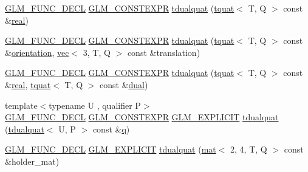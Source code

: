 \begin{DoxyCompactItemize}
\item 
\mbox{\hyperlink{setup_8hpp_ab2d052de21a70539923e9bcbf6e83a51}{G\+L\+M\+\_\+\+F\+U\+N\+C\+\_\+\+D\+E\+CL}} \mbox{\hyperlink{setup_8hpp_a08b807947b47031d3a511f03f89645ad}{G\+L\+M\+\_\+\+C\+O\+N\+S\+T\+E\+X\+PR}} \mbox{\hyperlink{structglm_1_1tdualquat_aca6bbe930bd0b26c217b535fe06df688}{tdualquat}} (\mbox{\hyperlink{structglm_1_1tquat}{tquat}}$<$ T, Q $>$ const \&\mbox{\hyperlink{structglm_1_1tdualquat_a25909f92feb14a77756d2e83f9ec0b20}{real}})
\item 
\mbox{\hyperlink{setup_8hpp_ab2d052de21a70539923e9bcbf6e83a51}{G\+L\+M\+\_\+\+F\+U\+N\+C\+\_\+\+D\+E\+CL}} \mbox{\hyperlink{setup_8hpp_a08b807947b47031d3a511f03f89645ad}{G\+L\+M\+\_\+\+C\+O\+N\+S\+T\+E\+X\+PR}} \mbox{\hyperlink{structglm_1_1tdualquat_aedfbe6fe7039943ccbf7d178731fa9b7}{tdualquat}} (\mbox{\hyperlink{structglm_1_1tquat}{tquat}}$<$ T, Q $>$ const \&\mbox{\hyperlink{group__gtx__rotate__vector_ga1a32fceb71962e6160e8af295c91930a}{orientation}}, \mbox{\hyperlink{structglm_1_1vec}{vec}}$<$ 3, T, Q $>$ const \&translation)
\item 
\mbox{\hyperlink{setup_8hpp_ab2d052de21a70539923e9bcbf6e83a51}{G\+L\+M\+\_\+\+F\+U\+N\+C\+\_\+\+D\+E\+CL}} \mbox{\hyperlink{setup_8hpp_a08b807947b47031d3a511f03f89645ad}{G\+L\+M\+\_\+\+C\+O\+N\+S\+T\+E\+X\+PR}} \mbox{\hyperlink{structglm_1_1tdualquat_ab86d3cf3f902945d1d774505b32f9f56}{tdualquat}} (\mbox{\hyperlink{structglm_1_1tquat}{tquat}}$<$ T, Q $>$ const \&\mbox{\hyperlink{structglm_1_1tdualquat_a25909f92feb14a77756d2e83f9ec0b20}{real}}, \mbox{\hyperlink{structglm_1_1tquat}{tquat}}$<$ T, Q $>$ const \&\mbox{\hyperlink{structglm_1_1tdualquat_a6e9bac4577ea5ff7e47104c183f3955a}{dual}})
\item 
{\footnotesize template$<$typename U , qualifier P$>$ }\\\mbox{\hyperlink{setup_8hpp_ab2d052de21a70539923e9bcbf6e83a51}{G\+L\+M\+\_\+\+F\+U\+N\+C\+\_\+\+D\+E\+CL}} \mbox{\hyperlink{setup_8hpp_a08b807947b47031d3a511f03f89645ad}{G\+L\+M\+\_\+\+C\+O\+N\+S\+T\+E\+X\+PR}} \mbox{\hyperlink{setup_8hpp_a6c74f5a5e7b134ab69023ff9a30d4d5d}{G\+L\+M\+\_\+\+E\+X\+P\+L\+I\+C\+IT}} \mbox{\hyperlink{structglm_1_1tdualquat_a1fbee84d447e37ac7542412dab82cbcf}{tdualquat}} (\mbox{\hyperlink{structglm_1_1tdualquat}{tdualquat}}$<$ U, P $>$ const \&\mbox{\hyperlink{_s_d_l__opengl_8h_a8fc1e7b9baaae687804c7eed46ca09c6}{q}})
\item 
\mbox{\hyperlink{setup_8hpp_ab2d052de21a70539923e9bcbf6e83a51}{G\+L\+M\+\_\+\+F\+U\+N\+C\+\_\+\+D\+E\+CL}} \mbox{\hyperlink{setup_8hpp_a6c74f5a5e7b134ab69023ff9a30d4d5d}{G\+L\+M\+\_\+\+E\+X\+P\+L\+I\+C\+IT}} \mbox{\hyperlink{structglm_1_1tdualquat_aaf58d434e56496978c027c3b7c021cfb}{tdualquat}} (\mbox{\hyperlink{structglm_1_1mat}{mat}}$<$ 2, 4, T, Q $>$ const \&holder\+\_\+mat)

\end{DoxyCompactItemize}
